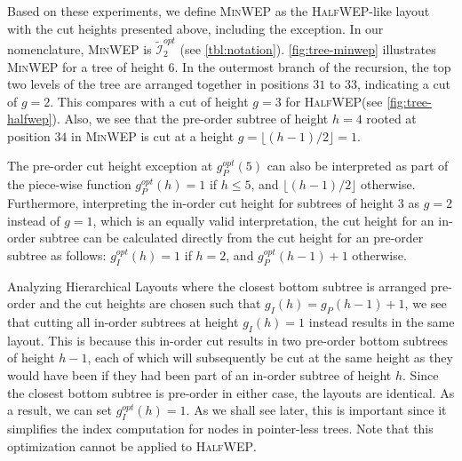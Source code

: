 \documentclass[10pt,conference,letterpaper]{IEEEtran}
\newcommand{\comment}[1]{}
\newcommand{\nodes}{nodes\xspace}
\newcommand{\HLs}{Hierarchical Layouts\xspace}
\newcommand{\IN}{\ensuremath{\mathcal{I}}\xspace}
\newcommand{\alt}[1]{\widetilde{#1}}
\newcommand{\opt}{\ensuremath{\mathit{opt}}\xspace}
\newcommand{\FLOOR}[1]{\ensuremath{\lfloor #1 \rfloor}\xspace}
\newcommand{\minwep}{\textsc{MinWEP}\xspace}
\newcommand{\halfwep}{\textsc{HalfWEP}\xspace}
\newcommand{\approxwep}{\textsc{ApproxWEP}\xspace}
\begin{document}
Based on these experiments, we define \minwep as the \halfwep-like layout with the cut heights presented above, including the exception. In our nomenclature, \minwep is $\alt{\IN}^\opt_2$ (see \autoref{tbl:notation}). \autoref{fig:tree-minwep} illustrates \minwep for a tree of height $6$. 
In the outermost branch of the recursion, the top two levels of the tree are arranged together in positions $31$ to $33$, indicating a cut of $g=2$. This compares with a cut of height $g=3$ for \halfwep (see \autoref{fig:tree-halfwep}). Also, we see that the pre-order subtree of height $h=4$ rooted at position $34$ in \minwep is cut at a height $g=\FLOOR{(h-1)/2}=1$.
\comment{
We also denote the layout that does not include the exception as \approxwep. Thus \approxwep is a layout that arranges the bottom subtrees closest to the top subtree pre-order and cuts them at height $g_{apx,P}=\max\{1,\FLOOR{(h-1)/2}\}$. It arranges all other subtrees in-order and cuts them at height $g_{apx,I}=\FLOOR{h/2}$, just like \halfwep does. 
}

The pre-order cut height exception at $g_P^\opt(5)$ can also be interpreted as part of the piece-wise function 
$g_P^\opt(h) = 1$ if $h \leq 5$, and $\FLOOR{(h-1)/2}$ otherwise. Furthermore, interpreting the in-order cut height for subtrees of height $3$ as $g=2$ instead of $g=1$, which is an equally valid interpretation, the cut height for an in-order subtree can be calculated directly from the cut height for an pre-order subtree as follows: $g_I^\opt(h) = 1$ if $h=2$, and $g_P^\opt(h-1) + 1$ otherwise. 

Analyzing \HLs where the closest bottom subtree is arranged pre-order and the cut heights are chosen such that $g_I(h) = g_P(h-1) + 1$, we see that cutting all in-order subtrees at height $g_I(h)=1$ instead results in the same layout. This is because this in-order cut results in two pre-order bottom subtrees of height $h-1$, each of which will subsequently be cut at the same height as they would have been if they had been part of an in-order subtree of height $h$. Since the closest bottom subtree is pre-order in either case, the layouts are identical. As a result, we can set $g_I^\opt(h) = 1$. As we shall see later, this is important since it simplifies the index computation for \nodes in pointer-less trees. 
Note that this optimization cannot be applied to \halfwep.
\comment{, since its pre-order and in-order cut heights are identical.}

\comment{
For small tree heights upto $h=6$, \approxwep is identical to \halfwep, and is not separately illustrated in \autoref{fig:tree-layouts}. For larger trees, \approxwep differs from \halfwep and \minwep slightly, and tends to perform similar to both.We have already seen from \autoref{fig:bt-in-pre} and \autoref{fig:veb} that in all the metrics considered, \halfwep and \approxwep already perform more or less identically. For this reason, we do not include \approxwep in our figures, even though it is different from \minwep.
}
\end{document}
